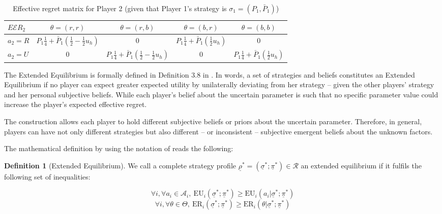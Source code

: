 \documentclass{article}
\theoremstyle{definition}
\newtheorem{definition}{Definition}[section]
\begin{document}
\begin{table}[H]
    \label{tab:UtilityGeneralUncertaintyIndividualistic}
\begin{center}
\small
\renewcommand{\arraystretch}{1.3} %
\begin{tabular}{| l|c c c c|}
\hline
\multirow{1}{*}{$E\mathcal{E}R_2$} & $\theta=(r,r)$  & $\theta=(r,b)$ & $\theta=(b,r)$ & $\theta=(b,b)$\\
\hline
  $a_2=R$ &
  $P_1\frac{1}{4} + \bar{P}_1 (\frac{1}{2} - \frac{1}{2} u_h)$ &
  $0$ &
  $P_1 \frac{1}{4} + \bar{P}_1 (\frac{1}{2} u_h)$ &
  $0$\\
\cline{1-5}
  $a_2=U$ &
  $0$ &
  $P_1\frac{1}{4} + \bar{P}_1 (\frac{1}{2} - \frac{1}{2} u_h)$ &
  $0$ &
  $P_1 \frac{1}{4} + \bar{P}_1 (\frac{1}{2} u_h)$\\
\hline
\end{tabular}
\caption{Effective regret matrix for Player 2 (given that Player 1's strategy is $\sigma_1=(P_1,\bar{P}_1)$)}
\end{center}
\end{table}

The Extended Equilibrium is formally defined in Definition 3.8 in \cite{arxiv:ExtendedEquilibrium}. In words, a set of strategies and beliefs constitutes an Extended Equilibrium if no player can expect greater expected utility by unilaterally deviating from her strategy -- given the other players' strategy and her personal subjective beliefs. While each player's belief about the uncertain parameter is such that no specific parameter value could increase the player's expected effective regret.

The construction allows each player to hold different subjective beliefs or priors about the uncertain parameter. Therefore, in general, players can have not only different strategies but also different -- or inconsistent -- subjective emergent beliefs about the unknown factors.

The mathematical definition by using the notation of \cite{arxiv:ExtendedEquilibrium} reads the following:

\begin{definition}[Extended Equilibrium]
\label{def:ExEq}
We call a complete strategy profile $\underline{\rho}^* = (\underline{\sigma}^*;\underline{\pi}^*) \in \mathcal{R}$ an extended equilibrium if it fulfils the following set of inequalities:

    \begin{equation}
    \label{defeq:ExtendedEquilibriumEU}
        \forall i, \forall a_i \in \mathcal{A}_i, \  \mathrm{EU}_i(\underline{\sigma}^*;\underline{\pi}^*) \ge \mathrm{EU}_i(a_i | \underline{\sigma}^*;\underline{\pi}^*)
    \end{equation}
    \begin{equation}
    \label{defeq:ExtendedEquilibriumER}
        \forall i, \forall \theta \in \Theta, \  \mathrm{ER}_i(\underline{\sigma}^*;\underline{\pi}^*) \ge \mathrm{ER}_i(\theta | \underline{\sigma}^*;\underline{\pi}^*)
    \end{equation}

\end{definition}
\end{document}
